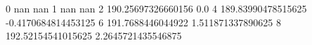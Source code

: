 0 nan nan
1 nan nan
2 190.25697326660156 0.0
4 189.83990478515625 -0.4170684814453125
6 191.7688446044922 1.511871337890625
8 192.52154541015625 2.2645721435546875
